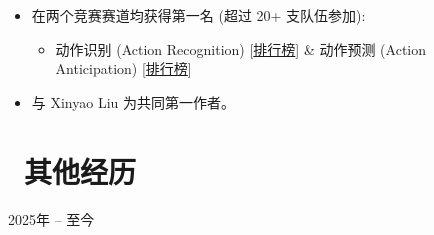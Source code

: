\documentclass[10pt]{resume}
\begin{document}
\small{
\begin{itemize}[parsep=0.5ex]
    \item 在两个竞赛赛道均获得第一名 (超过 20+ 支队伍参加):
    \begin{itemize}[topsep=0.2ex, itemsep=0.2ex] 
        \item 动作识别 (Action Recognition) [\href{https://thompson-challenge.grand-challenge.org/evaluation/action-recognition-result-submission/leaderboard/}{排行榜}] \& 动作预测 (Action Anticipation) [\href{https://thompson-challenge.grand-challenge.org/evaluation/action-anticipation-result-submission/leaderboard/}{排行榜}]
    \end{itemize}
    \item 与 Xinyao Liu 为共同第一作者。
\end{itemize}
}


\section{\faCogs\ 其他经历}
 {2025年 -- 至今}
\end{document}
